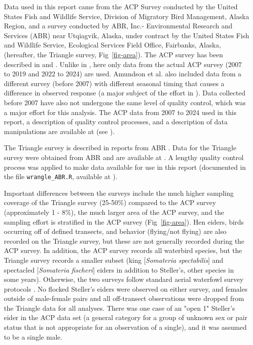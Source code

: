 \documentclass[
  10pt,
  letterpaper,
]{article}
\begin{document}
Data used in this report came from the ACP Survey conducted by the
United States Fish and Wildlife Service, Division of Migratory Bird
Management, Alaska Region, and a survey conducted by ABR, Inc.-
Environmental Research and Services (ABR) near Utqiagvik, Alaska, under
contract by the United States Fish and Wildlife Service, Ecological
Services Field Office, Fairbanks, Alaska, (hereafter, the Triangle
survey, Fig~\ref{fig-area}). The ACP survey has been described in
\citep{amundson2019} and \citep{wilson2025population}. Unlike in
\citep{amundson2019}, here only data from the actual ACP survey (2007 to
2019 and 2022 to 2024) are used. Amundson et al. \citep{amundson2019} also included data from a different survey (before 2007) with different seasonal timing that causes a difference in observed response (a major subject of the effort in \citep{amundson2019}). Data collected before 2007 have also not undergone the same level of quality control, which was a major effort for this analysis. The ACP data from 2007 to 2024 used in this report, a description of quality control processes, and a description of data manipulations are available at \citep{osnas-github, osnasACP} (see ).

The Triangle survey is described in reports from ABR
\citep{obritschkewitsch2008steller, triangleABR}. Data for the
Triangle survey were obtained from ABR and are available at
. A lengthy quality control process was applied to
make data available for use in this report (documented in the file
\texttt{wrangle\_ABR.R}, available at ).

Important differences between the surveys include the much higher
sampling coverage of the Triangle survey (25-50\%) compared to the ACP
survey (approximately 1 - 8\%), the much larger area of the ACP survey,
and the sampling effort is stratified in the ACP survey
(Fig~\ref{fig-area}). Hen eiders, birds occurring off of defined
transects, and behavior (flying/not flying) are also recorded on the
Triangle survey, but these are not generally recorded during the ACP
survey. In addition, the ACP survey records all waterbird species, but
the Triangle survey records a smaller subset (king {[}\emph{Somateria
spectabilis}{]} and spectacled {[}\emph{Somateria fischeri}{]} eiders in
addition to Steller's, other species in some years). Otherwise, the two
surveys follow standard aerial waterfowl survey protocols
\citep{cws1987}. No flocked Steller's eiders were observed on either
survey, and females outside of male-female pairs and all off-transect
observations were dropped from the Triangle data for all analyses. There
was one case of an "open 1" Steller's eider in the ACP data set (a
general category for a group of unknown sex or pair status that is not
appropriate for an observation of a single), and it was assumed to be a
single male.
\end{document}
